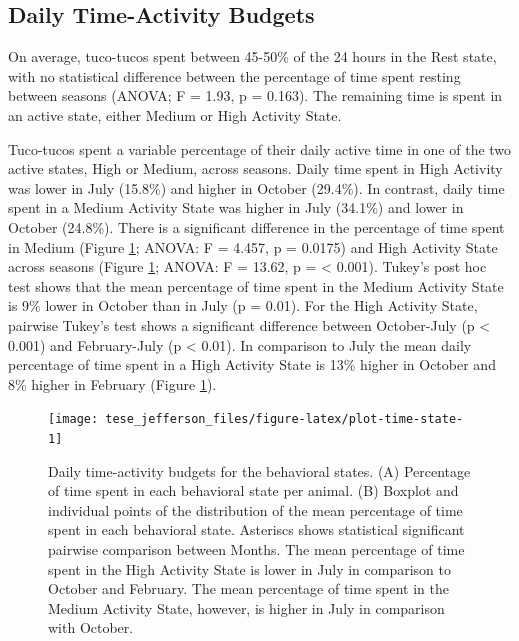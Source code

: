 \documentclass[english,msc,numbers,hidelinks]{coppe}
\begin{document}
  \hypertarget{daily-time-activity-budgets}{%
  \subsection{Daily Time-Activity Budgets}\label{daily-time-activity-budgets}}

  On average, tuco-tucos spent between 45-50\% of the 24 hours in the Rest state, with no statistical difference between the percentage of time spent resting between seasons (ANOVA; F = 1.93, p = 0.163). The remaining time is spent in an active state, either Medium or High Activity State.

  Tuco-tucos spent a variable percentage of their daily active time in one of the two active states, High or Medium, across seasons. Daily time spent in High Activity was lower in July (15.8\%) and higher in October (29.4\%). In contrast, daily time spent in a Medium Activity State was higher in July (34.1\%) and lower in October (24.8\%). There is a significant difference in the percentage of time spent in Medium (Figure \ref{fig:plot-time-state}; ANOVA: F = 4.457, p = 0.0175) and High Activity State across seasons (Figure \ref{fig:plot-time-state}; ANOVA: F = 13.62, p = \textless{} 0.001). Tukey's post hoc test shows that the mean percentage of time spent in the Medium Activity State is 9\% lower in October than in July (p = 0.01). For the High Activity State, pairwise Tukey's test shows a significant difference between October-July (p \textless{} 0.001) and February-July (p \textless{} 0.01). In comparison to July the mean daily percentage of time spent in a High Activity State is 13\% higher in October and 8\% higher in February (Figure \ref{fig:plot-time-state}).
  \begin{figure}

  {\centering \texttt{[image: tese\_jefferson\_files/figure-latex/plot-time-state-1]} 

  }

  \caption{Daily time-activity budgets for the behavioral states. (A) Percentage of time spent in each behavioral state per animal. (B) Boxplot and individual points of the distribution of the mean percentage of time spent in each behavioral state. Asteriscs shows statistical significant pairwise comparison between Months. The mean percentage of time spent in the High Activity State is lower in July in comparison to October and February. The mean percentage of time spent in the Medium Activity State, however, is higher in July in comparison with October.}\label{fig:plot-time-state}
  \end{figure}
  \newpage
\end{document}
